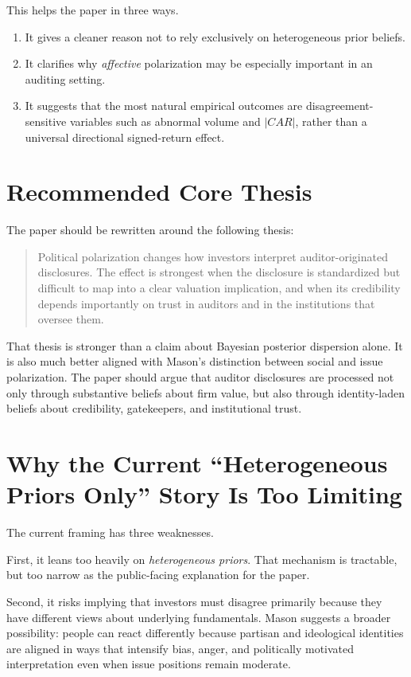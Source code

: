 \documentclass[12pt]{article}
\begin{document}
This helps the paper in three ways.

\begin{enumerate}[label=\textbf{M\arabic*.}]
    \item It gives a cleaner reason not to rely exclusively on heterogeneous prior beliefs.
    \item It clarifies why \emph{affective} polarization may be especially important in an auditing setting.
    \item It suggests that the most natural empirical outcomes are disagreement-sensitive variables such as abnormal volume and $|CAR|$, rather than a universal directional signed-return effect.
\end{enumerate}

\section{Recommended Core Thesis}

The paper should be rewritten around the following thesis:

\begin{quote}
Political polarization changes how investors interpret auditor-originated disclosures. The effect is strongest when the disclosure is standardized but difficult to map into a clear valuation implication, and when its credibility depends importantly on trust in auditors and in the institutions that oversee them.
\end{quote}

That thesis is stronger than a claim about Bayesian posterior dispersion alone. It is also much better aligned with Mason's distinction between social and issue polarization. The paper should argue that auditor disclosures are processed not only through substantive beliefs about firm value, but also through identity-laden beliefs about credibility, gatekeepers, and institutional trust.

\section{Why the Current ``Heterogeneous Priors Only'' Story Is Too Limiting}

The current framing has three weaknesses.

First, it leans too heavily on \emph{heterogeneous priors}. That mechanism is tractable, but too narrow as the public-facing explanation for the paper.

Second, it risks implying that investors must disagree primarily because they have different views about underlying fundamentals. Mason suggests a broader possibility: people can react differently because partisan and ideological identities are aligned in ways that intensify bias, anger, and politically motivated interpretation even when issue positions remain moderate.
\end{document}
